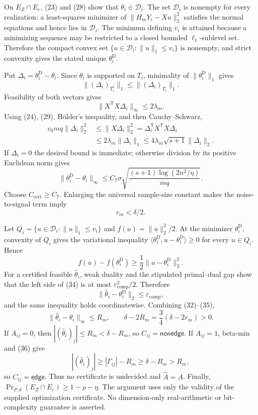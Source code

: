 On \(E_Z\cap E_\varepsilon\), (23) and (28) show that \(\theta_i\in\mathcal D_i\).  The set \(\mathcal D_i\) is nonempty for every realization: a least-squares minimizer of \(\lVert H_mY_i-Xu\rVert_2^2\) satisfies the normal equations and hence lies in \(\mathcal D_i\).  The minimum defining \(v_i\) is attained because a minimizing sequence may be restricted to a closed bounded \(\ell_1\)-sublevel set.  Therefore the compact convex set \(\{u\in\mathcal D_i:\lVert u\rVert_1\le v_i\}\) is nonempty, and strict convexity gives the stated unique \(\theta_i^{\mathrm D}\).

Put \(\Delta_i=\theta_i^{\mathrm D}-\theta_i\).  Since \(\theta_i\) is supported on \(T_i\), minimality of \(\lVert\theta_i^{\mathrm D}\rVert_1\) gives
\[
 \lVert(\Delta_i)_{T_i^c}\rVert_1
 \le\lVert(\Delta_i)_{T_i}\rVert_1.
 \tag{29}
\]
Feasibility of both vectors gives
\[
 \lVert X^{\mathsf T}X\Delta_i\rVert_\infty\le2\lambda_m.
 \tag{30}
\]
Using (24), (29), H\"older's inequality, and then Cauchy--Schwarz,
\[
 \begin{aligned}
 c_0mq\lVert\Delta_i\rVert_2^2
 &\le\lVert X\Delta_i\rVert_2^2
 =\Delta_i^{\mathsf T}X^{\mathsf T}X\Delta_i\\
 &\le2\lambda_m\lVert\Delta_i\rVert_1
 \le4\lambda_m\sqrt{s+1}\lVert\Delta_i\rVert_2.
 \end{aligned}
 \tag{31}
\]
If \(\Delta_i=0\) the desired bound is immediate; otherwise division by its positive Euclidean norm gives
\[
 \lVert\theta_i^{\mathrm D}-\theta_i\rVert_\infty
 \le C_7\sigma\sqrt{\frac{(s+1)\log(2n^2/\eta)}{mq}}.
 \tag{32}
\]
Choose \(C_{\mathrm{cert}}\ge C_7\).  Enlarging the universal sample-size constant makes the noise-to-signal term imply
\[
 r_m<\delta/2.
 \tag{33}
\]

Let \(Q_i=\{u\in\mathcal D_i:\lVert u\rVert_1\le v_i\}\) and \(f(u)=\lVert u\rVert_2^2/2\).  At the minimizer \(\theta_i^{\mathrm D}\), convexity of \(Q_i\) gives the variational inequality \(\langle\theta_i^{\mathrm D},u-\theta_i^{\mathrm D}\rangle\ge0\) for every \(u\in Q_i\).  Hence
\[
 f(u)-f(\theta_i^{\mathrm D})
 \ge\frac12\lVert u-\theta_i^{\mathrm D}\rVert_2^2.
 \tag{34}
\]
For a certified feasible \(\widehat\theta_i\), weak duality and the stipulated primal--dual gap show that the left side of (34) is at most \(\varepsilon_{\mathrm{comp}}^2/2\).  Therefore
\[
 \lVert\widehat\theta_i-\theta_i^{\mathrm D}\rVert_2
 \le\varepsilon_{\mathrm{comp}},
 \tag{35}
\]
and the same inequality holds coordinatewise.  Combining (32)--(35),
\[
 \lVert\widehat\theta_i-\theta_i\rVert_\infty\le R_m,
 \qquad
 \delta-2R_m=\frac34(\delta-2r_m)>0.
 \tag{36}
\]
If \(A_{ij}=0\), then \(|(\widehat\theta_i)_j|\le R_m<\delta-R_m\), so \(C_{ij}=\mathsf{nonedge}\).  If \(A_{ij}=1\), beta-min and (36) give
\[
 |(\widehat\theta_i)_j|
 \ge|\Gamma_{ij}|-R_m
 \ge\delta-R_m>R_m,
\]
so \(C_{ij}=\mathsf{edge}\).  Thus no certificate is undecided and \(\widehat A=A\).  Finally,
\(\Pr_{P,d}(E_Z\cap E_\varepsilon)\ge1-\rho-\eta\).  The argument uses only the validity of the supplied optimization certificate.  No dimension-only real-arithmetic or bit-complexity guarantee is asserted.